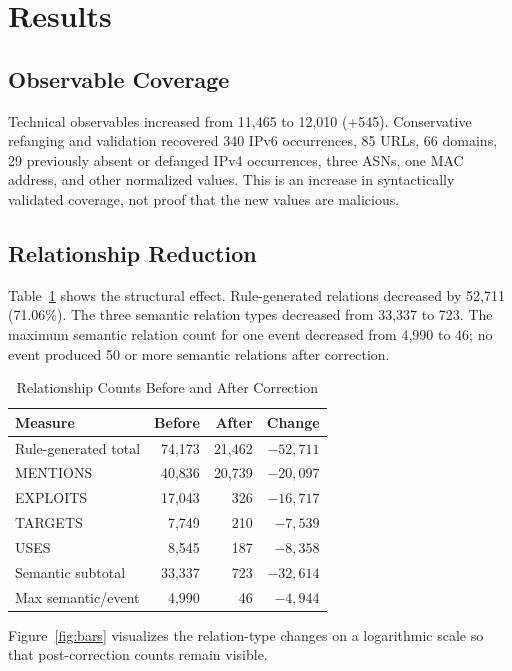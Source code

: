 \documentclass[conference]{IEEEtran}
\begin{document}
\section{Results}
\subsection{Observable Coverage}
Technical observables increased from 11,465 to 12,010 (+545). Conservative refanging and validation recovered 340 IPv6 occurrences, 85 URLs, 66 domains, 29 previously absent or defanged IPv4 occurrences, three ASNs, one MAC address, and other normalized values. This is an increase in syntactically validated coverage, not proof that the new values are malicious.

\subsection{Relationship Reduction}
Table~\ref{tab:relations} shows the structural effect. Rule-generated relations decreased by 52,711 (71.06\%). The three semantic relation types decreased from 33,337 to 723. The maximum semantic relation count for one event decreased from 4,990 to 46; no event produced 50 or more semantic relations after correction.

\begin{table}[t]
\caption{Relationship Counts Before and After Correction}
\label{tab:relations}
\centering
\small
\begin{tabular}{lrrr}
\toprule
Measure & Before & After & Change \\
\midrule
Rule-generated total & 74,173 & 21,462 & $-52,711$ \\
MENTIONS & 40,836 & 20,739 & $-20,097$ \\
EXPLOITS & 17,043 & 326 & $-16,717$ \\
TARGETS & 7,749 & 210 & $-7,539$ \\
USES & 8,545 & 187 & $-8,358$ \\
Semantic subtotal & 33,337 & 723 & $-32,614$ \\
Max semantic/event & 4,990 & 46 & $-4,944$ \\
\bottomrule
\end{tabular}
\end{table}

Figure~\ref{fig:bars} visualizes the relation-type changes on a logarithmic scale so that post-correction counts remain visible.
\end{document}
